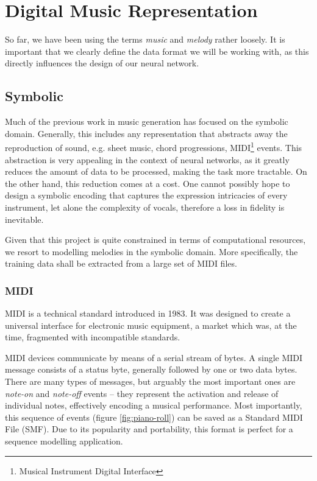 \documentclass[../../report.tex]{subfiles}
\begin{document}
\section{Digital Music Representation}

So far, we have been using the terms \emph{music} and \emph{melody} rather
loosely. It is important that we clearly define the data format we will be
working with, as this directly influences the design of our neural network.

\subsection{Symbolic}

Much of the previous work in music generation has focused on the symbolic
domain. Generally, this includes any representation that abstracts away the
reproduction of sound, e.g. sheet music, chord progressions,
MIDI\footnote{Musical Instrument Digital Interface} events. This abstraction is
very appealing in the context of neural networks, as it greatly reduces the
amount of data to be processed, making the task more tractable. On the other
hand, this reduction comes at a cost. One cannot possibly hope to design a
symbolic encoding that captures the expression intricacies of every instrument,
let alone the complexity of vocals, therefore a loss in fidelity is inevitable.
\cite{Dieleman2020}

Given that this project is quite constrained in terms of computational
resources, we resort to modelling melodies in the symbolic domain. More
specifically, the training data shall be extracted from a large set of MIDI
files.

\subsubsection{MIDI}
MIDI is a technical standard introduced in 1983. It was designed to create a
universal interface for electronic music equipment, a market which was, at the
time, fragmented with incompatible standards.

MIDI devices communicate by means of a serial stream of bytes. A single MIDI
message consists of a status byte, generally followed by one or two data bytes.
There are many types of messages, but arguably the most important ones are
\emph{note-on} and \emph{note-off} events -- they represent the activation and
release of individual notes, effectively encoding a musical performance. Most
importantly, this sequence of events (figure \ref{fig:piano-roll}) can be saved
as a Standard MIDI File (SMF). Due to its popularity and portability, this
format is perfect for a sequence modelling application. \cite{MIDI2015Messages,
MIDI2015Files}
\end{document}
